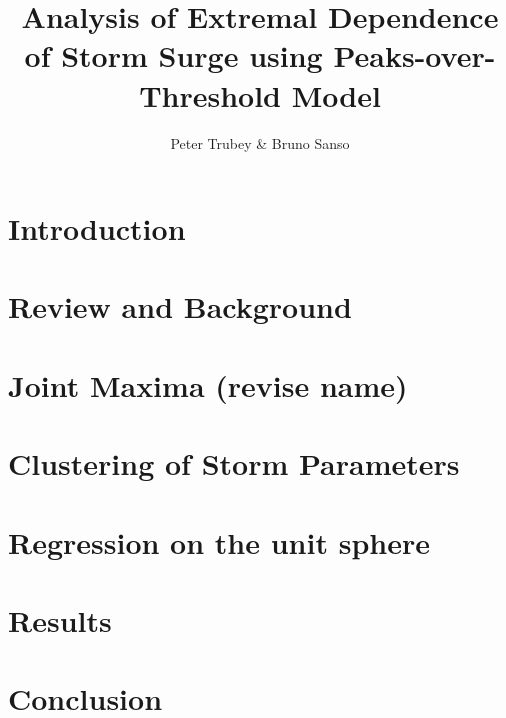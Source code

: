 \documentclass{article}
\title{Analysis of Extremal Dependence of Storm Surge using Peaks-over-Threshold Model}
\author{Peter Trubey \& Bruno Sanso}
\date{}
\begin{document}
\maketitle

\begin{abstract}
    
\end{abstract}

\section{Introduction\label{ref:introduction}}


\section{Review and Background\label{ref:review}}


%

\section{Joint Maxima (revise name)\label{sec:jointmaxima}}


\section{Clustering of Storm Parameters\label{sec:clustering}}


\section{Regression on the unit sphere\label{sec:regression}}


\section{Results\label{ref:results}}


\section{Conclusion\label{ref:conclusion}}


\appendix




\end{document}
